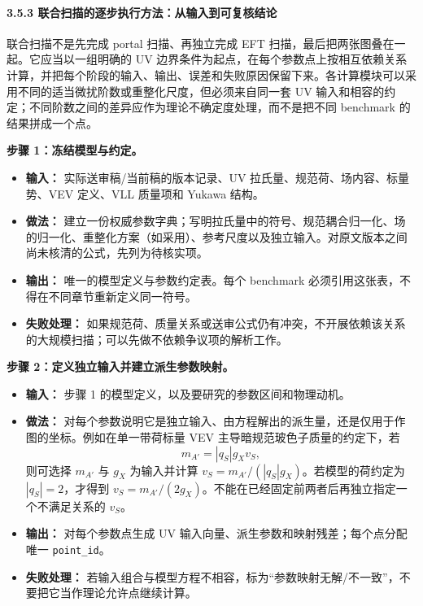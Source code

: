 \documentclass[
]{article}
\providecommand{\tightlist}{%
  \setlength{\itemsep}{0pt}\setlength{\parskip}{0pt}}
\begin{document}
\paragraph{3.5.3
联合扫描的逐步执行方法：从输入到可复核结论}\label{ux8054ux5408ux626bux63cfux7684ux9010ux6b65ux6267ux884cux65b9ux6cd5ux4eceux8f93ux5165ux5230ux53efux590dux6838ux7ed3ux8bba}

联合扫描不是先完成 portal 扫描、再独立完成 EFT
扫描，最后把两张图叠在一起。它应当以一组明确的 UV
边界条件为起点，在每个参数点上按相互依赖关系计算，并把每个阶段的输入、输出、误差和失败原因保留下来。各计算模块可以采用不同的适当微扰阶数或重整化尺度，但必须来自同一套
UV
输入和相容的约定；不同阶数之间的差异应作为理论不确定度处理，而不是把不同
benchmark 的结果拼成一个点。

\textbf{步骤 1：冻结模型与约定。}

\begin{itemize}
\tightlist
\item
  \textbf{输入：} 实际送审稿/当前稿的版本记录、UV
  拉氏量、规范荷、场内容、标量势、VEV 定义、VLL 质量项和 Yukawa 结构。
\item
  \textbf{做法：}
  建立一份权威参数字典；写明拉氏量中的符号、规范耦合归一化、场的归一化、重整化方案（如采用）、参考尺度以及独立输入。对原文版本之间尚未核清的公式，先列为待核实项。
\item
  \textbf{输出：} 唯一的模型定义与参数约定表。每个 benchmark
  必须引用这张表，不得在不同章节重新定义同一符号。
\item
  \textbf{失败处理：}
  如果规范荷、质量关系或送审公式仍有冲突，不开展依赖该关系的大规模扫描；可以先做不依赖争议项的解析工作。
\end{itemize}

\textbf{步骤 2：定义独立输入并建立派生参数映射。}

\begin{itemize}
\tightlist
\item
  \textbf{输入：} 步骤 1 的模型定义，以及要研究的参数区间和物理动机。
\item
  \textbf{做法：}
  对每个参数说明它是独立输入、由方程解出的派生量，还是仅用于作图的坐标。例如在单一带荷标量
  VEV 主导暗规范玻色子质量的约定下，若 \[
  m_{A'}=|q_S|g_Xv_S,
  \] 则可选择 \(m_{A'}\) 与 \(g_X\) 为输入并计算
  \(v_S=m_{A'}/(|q_S|g_X)\)。若模型的荷约定为 \(|q_S|=2\)，才得到
  \(v_S=m_{A'}/(2g_X)\)。不能在已经固定前两者后再独立指定一个不满足关系的
  \(v_S\)。
\item
  \textbf{输出：} 对每个参数点生成 UV
  输入向量、派生参数和映射残差；每个点分配唯一 \texttt{point\_id}。
\item
  \textbf{失败处理：}
  若输入组合与模型方程不相容，标为``参数映射无解/不一致''，不要把它当作理论允许点继续计算。
\end{itemize}
\end{document}
